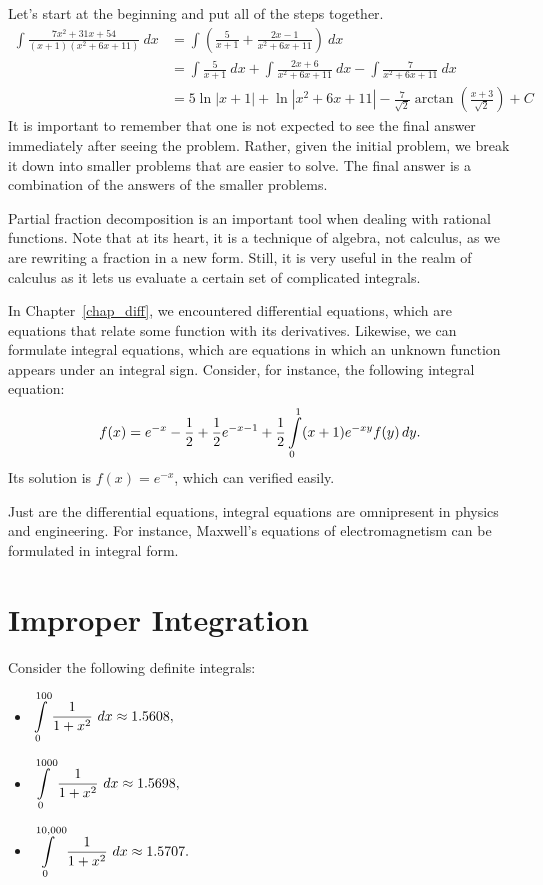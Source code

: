 \begin{example}
Let's start at the beginning and put all of the steps together.
\begin{align*}
\int\frac{7x^2+31x+54}{(x+1)(x^2+6x+11)}\ dx &= \int\left(\frac{5}{x+1} + \frac{2x-1}{x^2+6x+11}\right)\ dx\\[0.2cm] 
			&= \int\frac{5}{x+1}\ dx  + \int\frac{2x+6}{x^2+6x+11}\ dx -\int\frac{7}{x^2+6x+11}\ dx \\[0.2cm]
			&= 5\ln|x+1|+ \ln\left|x^2+6x+11\right| -\frac{7}{\sqrt{2}}\arctan\left(\frac{x+3}{\sqrt{2}}\right)+C
\end{align*}%
It is important to remember that one is not expected to see the final answer immediately after seeing the problem. Rather, given the initial problem, we break it down into smaller problems that are easier to solve. The final answer is a combination of the answers of the smaller problems.
\end{example}


Partial fraction decomposition is an important tool when dealing with rational functions. Note that at its heart, it is a technique of algebra, not calculus, as we are rewriting a fraction in a new form. Still, it is very useful in the realm of calculus as it lets us evaluate a certain set of complicated integrals.

\begin{remark}
In Chapter~\ref{chap_diff}, we encountered differential equations, which are equations  that relate some function with its derivatives. Likewise, we can formulate integral equations, which are equations in which an unknown function appears under an integral sign. Consider, for instance, the following integral equation:
$$
f(x)=e^{-x}-\dfrac{1}{2}+\dfrac{1}{2}e^{-x-1}+\dfrac{1}{2}\displaystyle\int\limits_0^1(x+1)e^{-xy}f(y)\,dy.
$$
Its solution is $f(x)=e^{-x}$, which can verified easily. 

Just are the differential equations, integral equations are omnipresent in physics and engineering. For instance, Maxwell's equations of electromagnetism can be formulated in integral form. 


\end{remark}


\section{Improper Integration}\label{sec:improper_integration}

Consider the following definite integrals:
\begin{multicols}{3}
\begin{itemize}
\item	$\ds \int\limits_0^{100}\frac1{1+x^2}\ dx \approx 1.5608,$
\item	$\ds \int\limits_0^{1000}\frac1{1+x^2}\ dx \approx 1.5698,$
\item	$\displaystyle \int\limits_0^{10,000}\frac1{1+x^2}\ dx \approx 1.5707.$
\end{itemize}
\end{multicols}


